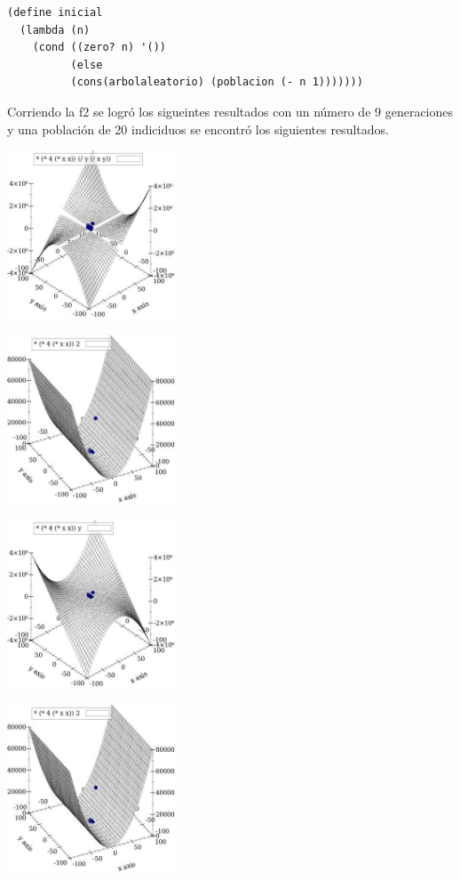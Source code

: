 \documentclass[10pt,a4paper]{article}
\begin{document}
\begin{verbatim}
(define inicial
  (lambda (n)
    (cond ((zero? n) '())
          (else
          (cons(arbolaleatorio) (poblacion (- n 1)))))))
\end{verbatim}
Corriendo la f2 se logró los sigueintes resultados con un número de 9 generaciones y una población de 20 indiciduos se encontró los siguientes resultados.\\
\begin{center}
\includegraphics[width=5cm, height=5cm]{f1-1}
\end{center}
\begin{center}
\includegraphics[width=5cm, height=5cm]{f1-2}
\end{center}
\begin{center}
\includegraphics[width=5cm, height=5cm]{f1-3}
\end{center}
\begin{center}
\includegraphics[width=5cm, height=5cm]{f1-4}
\end{center}
\end{document}

